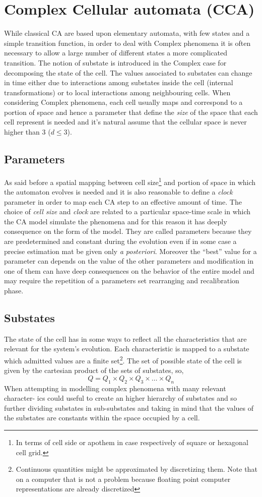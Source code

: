 \section{Complex Cellular automata (CCA)}
While classical CA are based upon elementary automata, with few states and a
simple transition function, in order to deal with Complex phenomena it is
often necessary to allow a large number of different states a more complicated
transition. The notion of substate is introduced in the Complex case for
decomposing the state of the cell. The values associated to substates can change
in time either due to interactions among substates inside the cell (internal
transformations) or to local interactions among neighbouring cells.
When considering Complex phenomena, each cell usually maps and correspond to
a portion of space and hence a parameter that define the \emph{size }of the
space that each cell represent is needed and it's natural assume that
the cellular space is never higher than 3 ($d \leq 3$).

\subsection{Parameters}
As said before a spatial mapping between cell size\footnote{In terms of cell
side or apothem in case respectively of square or hexagonal cell grid.} and
portion of space in which the automaton evolves is needed and it is also
reasonable to define a \emph{clock} parameter in order to map each CA step to an
effective amount of time. The choice of \emph{cell size} and \emph{clock} are
related to a particular space-time scale in which the CA model simulate the
phenomena and for this reason it has deeply consequence on the form of the model.
They are called parameters because they are predetermined and constant during
the evolution even if in some case a precise estimation mat be given only
\textit{a posteriori}. Moreover the ``best'' value for a parameter can depends 
on the value of the other parameters and modification in one of them  can have
deep consequences on the behavior of the entire model and may require the
repetition of a parameters set rearranging and recalibration phase.


\subsection{Substates}
The state of the cell has in some ways to reflect all the characteristics that
are relevant for the system's evolution. Each characteristic is mapped
to a substate which admitted values are a finite set\footnote{Continuous
quantities might be approximated by discretizing them. Note that on a computer
that is not a problem because floating point computer representations are
already discretized}.
The set of possible state of the cell is given by the cartesian product of  the
sets of substates, so, 
\[
Q = Q_1 \times Q_2 \times Q_3 \times \ldots \times Q_n
\]
When attempting in modelling complex phenomena with many relevant character-
ics could useful to create an higher hierarchy of substates and so further dividing
substates in sub-substates and taking in mind that the values of the substates are
constants within the space occupied by a cell.

